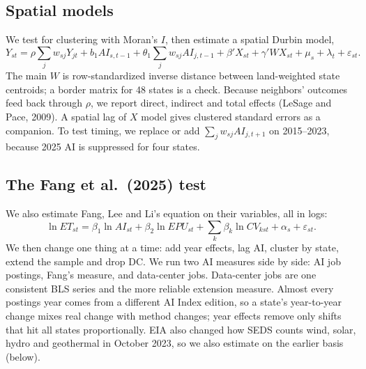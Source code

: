 \subsection{Spatial models}
We test for clustering with Moran's $I$, then estimate a spatial Durbin model,
\begin{equation}
Y_{st} = \rho \sum_j w_{sj} Y_{jt} + b_1 AI_{s,t-1} + \theta_1 \sum_j w_{sj} AI_{j,t-1} + \beta' X_{st} + \gamma' W X_{st} + \mu_s + \lambda_t + \varepsilon_{st}.
\end{equation}
The main $W$ is row-standardized inverse distance between land-weighted state centroids; a border matrix for 48 states is a check. Because neighbors' outcomes feed back through $\rho$, we report direct, indirect and total effects (LeSage and Pace, 2009). A spatial lag of $X$ model gives clustered standard errors as a companion. To test timing, we replace or add $\sum_j w_{sj} AI_{j,t+1}$ on 2015--2023, because 2025 AI is suppressed for four states.

\subsection{The Fang et al.\ (2025) test}
We also estimate Fang, Lee and Li's equation on their variables, all in logs:
\begin{equation}
\ln ET_{st} = \beta_1 \ln AI_{st} + \beta_2 \ln EPU_{st} + \sum_k \beta_k \ln CV_{kst} + \alpha_s + \varepsilon_{st}.
\end{equation}
We then change one thing at a time: add year effects, lag AI, cluster by state, extend the sample and drop DC. We run two AI measures side by side: AI job postings, Fang's measure, and data-center jobs. Data-center jobs are one consistent BLS series and the more reliable extension measure. Almost every postings year comes from a different AI Index edition, so a state's year-to-year change mixes real change with method changes; year effects remove only shifts that hit all states proportionally. EIA also changed how SEDS counts wind, solar, hydro and geothermal in October 2023, so we also estimate on the earlier basis (below).

